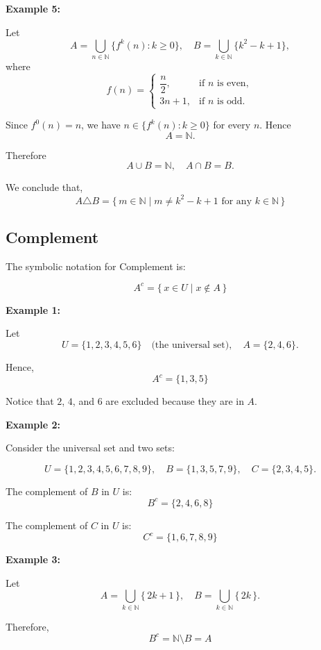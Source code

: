 \documentclass[12pt,a4paper,openany]{article}
\begin{document}
\textbf{Example 5:}

Let
\[
A= \displaystyle\bigcup_{n\in\mathbb{N}}\{f^k(n):k\ge0\},\quad
B=\bigcup_{k\in\mathbb{N}}\{k^2-k+1\},
\]
where
\[
f(n) =
\begin{cases}
\dfrac{n}{2}, & \text{if $n$ is even},\\[2mm]
3n + 1, & \text{if $n$ is odd}.
\end{cases}
\]

Since $f^0(n)=n$, we have $n\in\{f^k(n):k\ge0\}$ for every $n$. Hence
\[
A=\mathbb{N}.
\]

Therefore
\[
A\cup B=\mathbb{N},\quad A\cap B=B.
\]

We conclude that,
\[
\boxed{A\triangle B = \{\,m\in\mathbb{N}\mid m\neq k^2-k+1\text{ for any }k\in\mathbb{N}\,\}}
\]

\subsection{Complement}\label{Complement}

The symbolic notation for Complement is:  

$$
A^c = \{\, x \in U \mid x \notin A \,\}
$$

\textbf{Example 1:}

Let  
\[
U = \{1, 2, 3, 4, 5, 6\} \quad \text{(the universal set)}, \quad 
A = \{2, 4, 6\}.
\]

Hence,
\[
\boxed{A^c = \{1, 3, 5\}}
\]

Notice that $2$, $4$, and $6$ are excluded because they are in $A$.

\vspace{1em}

\textbf{Example 2:}

Consider the universal set and two sets:

\[
U = \{1, 2, 3, 4, 5, 6, 7, 8, 9\}, \quad 
B = \{1, 3, 5, 7, 9\}, \quad 
C = \{2, 3, 4, 5\}.
\]

The complement of $B$ in $U$ is:
\[
\boxed{B^c = \{2, 4, 6, 8\}}
\]

The complement of $C$ in $U$ is:
\[
\boxed{C^c = \{1, 6, 7, 8, 9\}}
\]

\vspace{1em}

\textbf{Example 3:}

Let
\[
A = \displaystyle\bigcup_{k \in \mathbb{N}} \{\,2k+1\,\}, \quad
B = \bigcup_{k \in \mathbb{N}} \{\,2k\,\}.
\]

Therefore,
\[
\boxed{B^c = \mathbb{N} \setminus B = A}
\]
\end{document}
